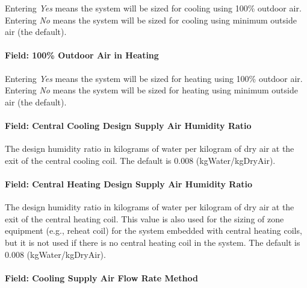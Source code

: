 Entering \emph{Yes} means the system will be sized for cooling using 100\% outdoor air. Entering \emph{No} means the system will be sized for cooling using minimum outside air (the default).

\paragraph{Field: 100\% Outdoor Air in Heating}\label{field-100-outdoor-air-in-heating}

Entering \emph{Yes} means the system will be sized for heating using 100\% outdoor air. Entering \emph{No} means the system will be sized for heating using minimum outside air (the default).

\paragraph{Field: Central Cooling Design Supply Air Humidity Ratio}\label{field-central-cooling-design-supply-air-humidity-ratio}

The design humidity ratio in kilograms of water per kilogram of dry air at the exit of the central cooling coil. The default is 0.008 (kgWater/kgDryAir).

\paragraph{Field: Central Heating Design Supply Air Humidity Ratio}\label{field-central-heating-design-supply-air-humidity-ratio}

The design humidity ratio in kilograms of water per kilogram of dry air at the exit of the central heating coil. This value is also used for the sizing of zone equipment (e.g., reheat coil) for the system embedded with central heating coils, but it is not used if there is no central heating coil in the system. The default is 0.008 (kgWater/kgDryAir).

\paragraph{Field: Cooling Supply Air Flow Rate Method}\label{field-cooling-supply-air-flow-rate-method}


